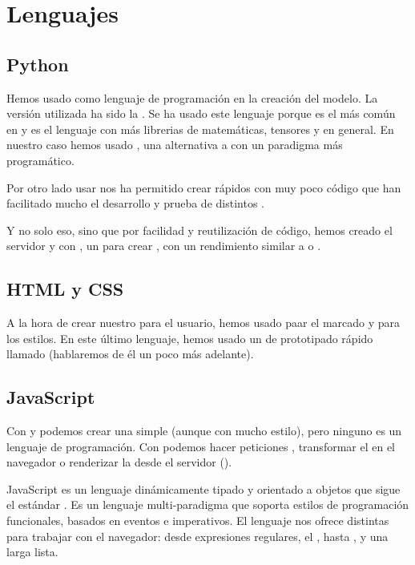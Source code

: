 
\section{Lenguajes}

\subsection{Python}

Hemos usado  como lenguaje de programación en la creación del modelo. La versión utilizada ha sido la . Se ha usado este lenguaje porque es el más común en  y es el lenguaje con más librerias de matemáticas, tensores y  en general. En nuestro caso hemos usado , una alternativa a  con un paradigma más programático.

Por otro lado usar  nos ha permitido crear  rápidos con muy poco código que han facilitado mucho el desarrollo y prueba de distintos .

Y no solo eso, sino que por facilidad y reutilización de código, hemos creado el servidor y  con , un  para crear , con un rendimiento similar a  o .

\subsection{HTML y CSS}

A la hora de crear nuestro  para el usuario, hemos usado  paar el marcado y  para los estilos. En este último lenguaje, hemos usado un  de prototipado rápido llamado  (hablaremos de él un poco más adelante).

\subsection{JavaScript}

Con  y  podemos crear una  simple (aunque con mucho estilo), pero ninguno es un lenguaje de programación. Con  podemos hacer peticiones , transformar el  en el navegador o renderizar la  desde el servidor ().

JavaScript es un lenguaje dinámicamente tipado y orientado a objetos que sigue el estándar . Es un lenguaje multi-paradigma que soporta estilos de programación funcionales, basados en eventos e imperativos. El lenguaje nos ofrece distintas  para trabajar con el navegador: desde expresiones regulares, el , hasta , y una larga lista.

